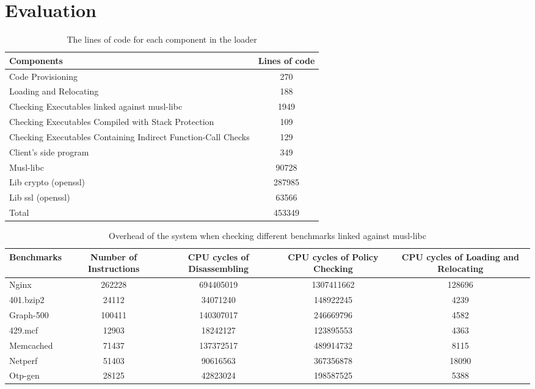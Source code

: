 \section{Evaluation}
\label{section:evaluation}
\begin{table*}[t]
\centering
\footnotesize{
\begin{tabular}{|l|c|}
\hline
 \bf Components                    & \bf Lines of code \\
\hline
Code Provisioning & 270\\
\hline
Loading and Relocating & 188\\
\hline
Checking Executables linked against musl-libc & 1949\\
\hline
Checking Executables Compiled with Stack Protection & 109\\
\hline
Checking Executables Containing Indirect Function-Call Checks & 129\\
\hline
Client's side program & 349\\
\hline
Musl-libc & 90728\\
\hline
Lib crypto (openssl) & 287985\\
\hline
Lib ssl (openssl) & 63566\\
\hline
Total & 453349\\
\hline
\end{tabular}
}
\caption{The lines of code for each component in the loader}
{\label{table:tcb}}
\end{table*}

\begin{table*}[t]
\centering
\footnotesize{
\begin{tabular}{|l|c|c|c|c|}
\hline
 \bf Benchmarks                    & \bf Number of Instructions & \bf CPU cycles of  Disassembling & \bf CPU cycles of Policy Checking & \bf CPU cycles of Loading and Relocating\\
\hline
Nginx & 262228 & 694405019 & 1307411662 & 128696\\
\hline
401.bzip2 & 24112 & 34071240 & 148922245 & 4239\\
\hline
Graph-500 & 100411 & 140307017 & 246669796 & 4582\\
\hline
429.mcf & 12903 & 18242127 & 123895553 & 4363\\
\hline
Memcached & 71437 & 137372517 & 489914732 & 8115\\
\hline
Netperf & 51403 & 90616563 & 367356878 & 18090\\
\hline
Otp-gen & 28125 & 42823024 & 198587525 & 5388\\
\hline
\end{tabular}
}
\caption{Overhead of the system when checking different benchmarks linked against musl-libc}{\label{table:checkinglinkedlib}}
\end{table*}

